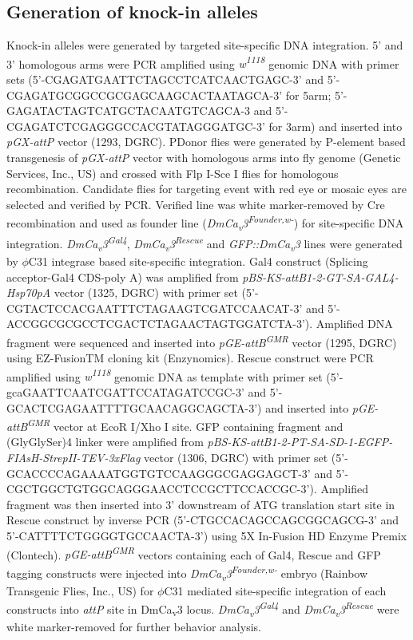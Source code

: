 \subsection*{Generation of knock-in alleles}

Knock-in alleles were generated by targeted site-specific DNA integration. 
5’ and 3’ homologous arms were PCR amplified using \emph{w\textsuperscript{1118}} genomic DNA with primer sets (5’-CGAGATGAATTCTAGCCTCATCAACTGAGC-3’ and 5’-CGAGATGCGGCCGCGAGCAAGCACTAATAGCA-3’ for 5arm; 5’-GAGATACTAGTCATGCTACAATGTCAGCA-3 and 5’-CGAGATCTCGAGGGCCACGTATAGGGATGC-3’ for 3arm) and inserted into \emph{pGX-attP} vector (1293, DGRC). 
P{Donor} flies were generated by P-element based transgenesis of \emph{pGX-attP} vector with homologous arms into fly genome (Genetic Services, Inc., US) and crossed with Flp I-Sce I flies for homologous recombination. 
Candidate flies for targeting event with red eye or mosaic eyes are selected and verified by PCR. 
Verified line was white marker-removed by Cre recombination and used as founder line (\emph{DmCa\textsubscript{v}3\textsuperscript{Founder,w-}}) for site-specific DNA integration.
\emph{DmCa\textsubscript{v}3\textsuperscript{Gal4}}, \emph{DmCa\textsubscript{v}3\textsuperscript{Rescue}} and \emph{GFP::DmCa\textsubscript{v}3} lines were generated by $\phi$C31 integrase based site-specific integration. 
Gal4 construct (Splicing acceptor-Gal4 CDS-poly A) was amplified from \emph{pBS-KS-attB1-2-GT-SA-GAL4-Hsp70pA} vector (1325, DGRC) with primer set (5’-CGTACTCCACGAATTTCTAGAAGTCGATCCAACAT-3’ and 5’-ACCGGCGCGCCTCGACTCTAGAACTAGTGGATCTA-3’). 
Amplified DNA fragment were sequenced and inserted into \emph{pGE-attB\textsuperscript{GMR}} vector (1295, DGRC) using EZ-FusionTM cloning kit (Enzynomics). 
Rescue construct were PCR amplified using \emph{w\textsuperscript{1118}} genomic DNA as template with primer set (5’-gcaGAATTCAATCGATTCCATAGATCCGC-3’ and 5’-GCACTCGAGAATTTTGCAACAGGCAGCTA-3’) and inserted into \emph{pGE-attB\textsuperscript{GMR}} vector at EcoR I/Xho I site. 
GFP containing fragment and (GlyGlySer)4 linker were amplified from \emph{pBS-KS-attB1-2-PT-SA-SD-1-EGFP-FIAsH-StrepII-TEV-3xFlag} vector (1306, DGRC) with primer set (5’-GCACCCCAGAAAATGGTGTCCAAGGGCGAGGAGCT-3’ and 5’-CGCTGGCTGTGGCAGGGAACCTCCGCTTCCACCGC-3’). 
Amplified fragment was then inserted into 3’ downstream of ATG translation start site in Rescue construct by inverse PCR (5’-CTGCCACAGCCAGCGGCAGCG-3’ and 5’-CATTTTCTGGGGTGCCAACTA-3’) using 5X In-Fusion HD Enzyme Premix (Clontech).       
\emph{pGE-attB\textsuperscript{GMR}} vectors containing each of Gal4, Rescue and GFP tagging constructs were injected into \emph{DmCa\textsubscript{v}3\textsuperscript{Founder,w-}} embryo (Rainbow Transgenic Flies, Inc., US) for $\phi$C31 mediated site-specific integration of each constructs into \emph{attP} site in DmCa\textsubscript{v}3 locus. \emph{DmCa\textsubscript{v}3\textsuperscript{Gal4}} and \emph{DmCa\textsubscript{v}3\textsuperscript{Rescue}} were white marker-removed for further behavior analysis.

  
  
  
  
  